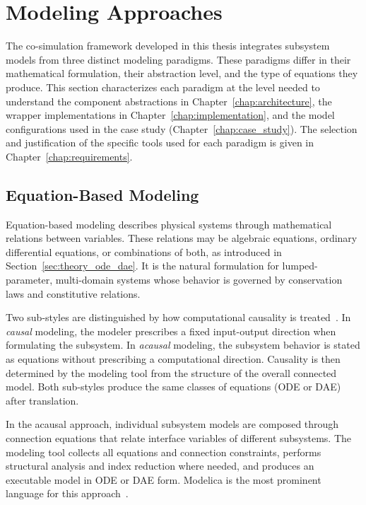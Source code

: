 \section{Modeling Approaches}
\label{sec:modeling_approaches}

The co-simulation framework developed in this thesis integrates subsystem models from three distinct modeling paradigms.
These paradigms differ in their mathematical formulation, their abstraction level, and the type of equations they produce.
This section characterizes each paradigm at the level needed to understand the component abstractions in Chapter~\ref{chap:architecture}, the wrapper implementations in Chapter~\ref{chap:implementation}, and the model configurations
used in the case study (Chapter~\ref{chap:case_study}).
The selection and justification of the specific tools used for each paradigm is given in Chapter~\ref{chap:requirements}.

\subsection{Equation-Based Modeling}
\label{sec:modeling_equation_based}

Equation-based modeling describes physical systems through mathematical relations between variables.
These relations may be algebraic equations, ordinary differential equations, or combinations of both, as introduced in Section~\ref{sec:theory_ode_dae}.
It is the natural formulation for lumped-parameter, multi-domain systems whose behavior is governed by conservation laws and constitutive relations.

Two sub-styles are distinguished by how computational causality is treated~\cite{Modelica_Fritzson}.
In \emph{causal} modeling, the modeler prescribes a fixed input-output direction when formulating the subsystem.
In \emph{acausal} modeling, the subsystem behavior is stated as equations without prescribing a computational direction.
Causality is then determined by the modeling tool from the structure of the overall connected model.
Both sub-styles produce the same classes of equations (ODE or DAE) after translation.

In the acausal approach, individual subsystem models are composed through connection equations that relate interface variables of different subsystems.
The modeling tool collects all equations and connection constraints, performs structural analysis and index reduction where needed, and  produces an executable model in ODE or DAE form.
Modelica is the most prominent language for this approach~\cite{Modelica_Fritzson}.

